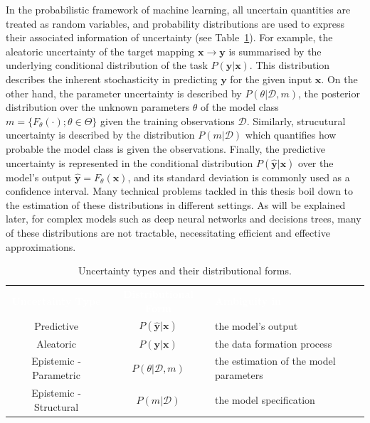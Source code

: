 In the probabilistic framework of machine learning, all uncertain quantities are treated as random variables, and 
probability distributions are used to express their associated information of uncertainty (see Table~\ref{tab:UncTypes}). For example, the aleatoric uncertainty of the target mapping $\textbf{x} \rightarrow \mathbf{y}$ is summarised by the underlying conditional distribution of the task $P(\mathbf{y}|\mathbf{x})$. This distribution describes the inherent stochasticity in predicting $\mathbf{y}$ for the given input $\mathbf{x}$. On the other hand, the parameter uncertainty is described by $P(\theta|\mathcal{D}, m)$, the posterior distribution over the unknown parameters $\theta$ of the model class $m=\{F_{\theta}(\cdot); \theta \in \Theta\}$ given the training observations $\mathcal{D}$. Similarly, strucutural uncertainty is described by the distribution $P(m|\mathcal{D})$ which quantifies how probable the model class is given the observations. Finally, the predictive uncertainty is represented in the conditional distribution $P(\hat{\mathbf{y}}|\mathbf{x})$ over the model's output $\hat{\mathbf{y}}=F_{\theta}(\mathbf{x})$, and its standard deviation is commonly used as a confidence interval. Many technical problems tackled in this thesis boil down to the estimation of these distributions in different settings. As will be explained later, for complex models such as deep neural networks and decisions trees, many of these distributions are not tractable, necessitating efficient and effective approximations. 

\begin{table}[h!]
    \centering
    \footnotesize
    \caption{Uncertainty types and their distributional forms.}
    \begin{tabularx}{\linewidth}{ c c X }
        \rowcolor{black}
        \textcolor{white}{\textbf{Uncertainty Type}} & \textcolor{white}{\textbf{Distributional Form}} & \textcolor{white}{\textbf{Ambiguity in }} \\
        \arrayrulecolor{white}\hline
        \rowcolor{gray!15}
        Predictive& $P(\hat{\mathbf{y}}|\mathbf{x})$ &   the model's output\\
        \arrayrulecolor{white}\hline
        \rowcolor{gray!15}
        Aleatoric& $P(\mathbf{y}|\mathbf{x})$ &  the data formation process\\
        \arrayrulecolor{white}\hline
        \rowcolor{gray!15}
        Epistemic - Parametric & $P(\theta|\mathcal{D},m)$ & the estimation of the model parameters \\
        \arrayrulecolor{white}\hline
        \rowcolor{gray!15}
        Epistemic - Structural &  $P(m|\mathcal{D})$  & the model specification \\
    \end{tabularx}
    \label{tab:UncTypes}
\end{table}

